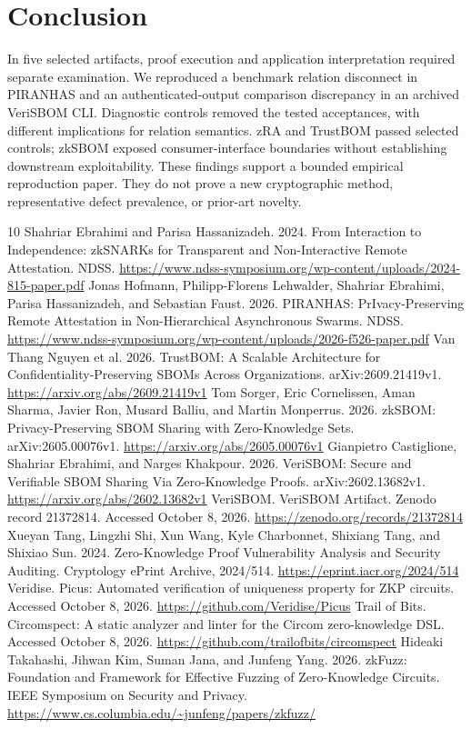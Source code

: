 \documentclass[sigconf,nonacm]{acmart}
\begin{document}
\section{Conclusion}
In five selected artifacts, proof execution and application interpretation required separate examination. We reproduced a benchmark relation disconnect in PIRANHAS and an authenticated-output comparison discrepancy in an archived VeriSBOM CLI. Diagnostic controls removed the tested acceptances, with different implications for relation semantics. zRA and TrustBOM passed selected controls; zkSBOM exposed consumer-interface boundaries without establishing downstream exploitability. These findings support a bounded empirical reproduction paper. They do not prove a new cryptographic method, representative defect prevalence, or prior-art novelty.

\begin{thebibliography}{10}
\sloppy
{} Shahriar Ebrahimi and Parisa Hassanizadeh. 2024. From Interaction to Independence: zkSNARKs for Transparent and Non-Interactive Remote Attestation. NDSS. \url{https://www.ndss-symposium.org/wp-content/uploads/2024-815-paper.pdf}
 Jonas Hofmann, Philipp-Florens Lehwalder, Shahriar Ebrahimi, Parisa Hassanizadeh, and Sebastian Faust. 2026. PIRANHAS: PrIvacy-Preserving Remote Attestation in Non-Hierarchical Asynchronous Swarms. NDSS. \url{https://www.ndss-symposium.org/wp-content/uploads/2026-f526-paper.pdf}
 Van Thang Nguyen et al. 2026. TrustBOM: A Scalable Architecture for Confidentiality-Preserving SBOMs Across Organizations. arXiv:2609.21419v1. \url{https://arxiv.org/abs/2609.21419v1}
 Tom Sorger, Eric Cornelissen, Aman Sharma, Javier Ron, Musard Balliu, and Martin Monperrus. 2026. zkSBOM: Privacy-Preserving SBOM Sharing with Zero-Knowledge Sets. arXiv:2605.00076v1. \url{https://arxiv.org/abs/2605.00076v1}
 Gianpietro Castiglione, Shahriar Ebrahimi, and Narges Khakpour. 2026. VeriSBOM: Secure and Verifiable SBOM Sharing Via Zero-Knowledge Proofs. arXiv:2602.13682v1. \url{https://arxiv.org/abs/2602.13682v1}
 VeriSBOM. VeriSBOM Artifact. Zenodo record 21372814. Accessed October 8, 2026. \url{https://zenodo.org/records/21372814}
 Xueyan Tang, Lingzhi Shi, Xun Wang, Kyle Charbonnet, Shixiang Tang, and Shixiao Sun. 2024. Zero-Knowledge Proof Vulnerability Analysis and Security Auditing. Cryptology ePrint Archive, 2024/514. \url{https://eprint.iacr.org/2024/514}
 Veridise. Picus: Automated verification of uniqueness property for ZKP circuits. Accessed October 8, 2026. \url{https://github.com/Veridise/Picus}
 Trail of Bits. Circomspect: A static analyzer and linter for the Circom zero-knowledge DSL. Accessed October 8, 2026. \url{https://github.com/trailofbits/circomspect}
 Hideaki Takahashi, Jihwan Kim, Suman Jana, and Junfeng Yang. 2026. zkFuzz: Foundation and Framework for Effective Fuzzing of Zero-Knowledge Circuits. IEEE Symposium on Security and Privacy. \url{https://www.cs.columbia.edu/~junfeng/papers/zkfuzz/}
\end{thebibliography}
\end{document}
